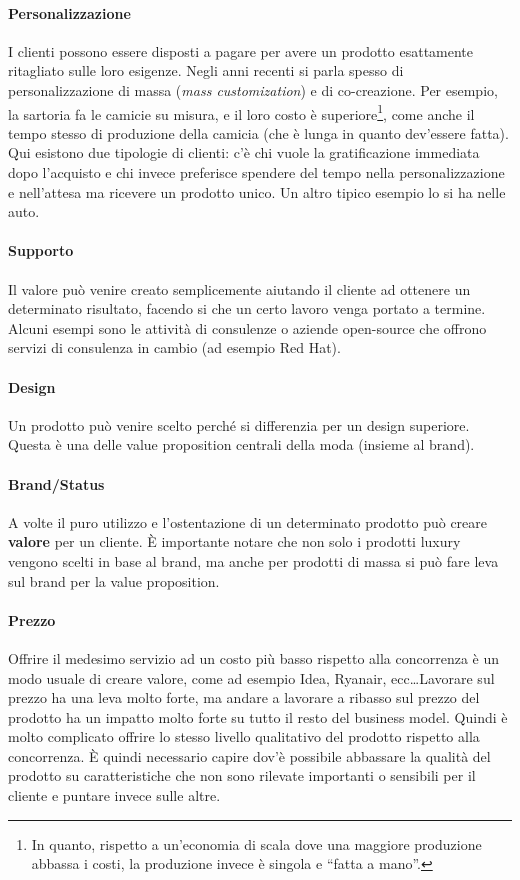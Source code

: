 \paragraph*{Personalizzazione} I clienti possono essere disposti a pagare per
avere un prodotto esattamente ritagliato sulle loro esigenze. Negli anni
recenti si parla spesso di personalizzazione di massa (\textit{mass
customization}) e di co-creazione. Per esempio, la sartoria fa le camicie su
misura, e il loro costo è superiore\footnote{In quanto, rispetto a un'economia
di scala dove una maggiore produzione abbassa i costi, la produzione invece è
singola e ``fatta a mano''.}, come anche il tempo stesso di produzione della
camicia (che è lunga in quanto dev'essere fatta). Qui esistono due tipologie di
clienti: c'è chi vuole la gratificazione immediata dopo l'acquisto e chi invece
preferisce spendere del tempo nella personalizzazione e nell'attesa ma ricevere
un prodotto unico.
Un altro tipico esempio lo si ha nelle auto.

\paragraph*{Supporto} Il valore può venire creato semplicemente aiutando il
cliente ad ottenere un determinato risultato, facendo si che un certo lavoro
venga portato a termine. Alcuni esempi sono le attività di consulenze o aziende
open-source che offrono servizi di consulenza in cambio (ad esempio Red Hat).

\paragraph*{Design} Un prodotto può venire scelto perché si differenzia per un
design superiore. Questa è una delle value proposition centrali della moda
(insieme al brand).

\paragraph*{Brand/Status} A volte il puro utilizzo e l'ostentazione di un
determinato prodotto può creare \textbf{valore} per un cliente. È importante
notare che non solo i prodotti luxury vengono scelti in base al brand, ma anche
per prodotti di massa si può fare leva sul brand per la value proposition.

\paragraph*{Prezzo} Offrire il medesimo servizio ad un costo più basso rispetto
alla concorrenza è un modo usuale di creare valore, come ad esempio Idea,
Ryanair, ecc\dots Lavorare sul prezzo ha una leva molto forte, ma andare a
lavorare a ribasso sul prezzo del prodotto ha un impatto molto forte su tutto
il resto del business model. Quindi è molto complicato offrire lo stesso
livello qualitativo del prodotto rispetto alla concorrenza. È quindi necessario
capire dov'è possibile abbassare la qualità del prodotto su caratteristiche che
non sono rilevate importanti o sensibili per il cliente e puntare invece sulle
altre.

